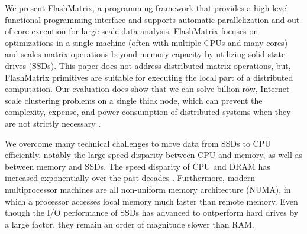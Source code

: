

We present FlashMatrix, a programming framework that provides a high-level
functional programming interface and supports automatic
parallelization and out-of-core execution for large-scale data analysis.
FlashMatrix focuses on optimizations in a single machine (often with multiple
CPUs and many cores) and scales matrix operations beyond memory capacity by 
utilizing solid-state drives (SSDs).  
This paper does not address distributed matrix operations, but, 
FlashMatrix primitives are suitable for executing the local part of a distributed 
computation.   
Our evaluation does show that we can solve billion row, Internet-scale 
clustering problems on a single thick node, which can prevent the complexity,
expense, and power consumption of distributed systems when they are not strictly necessary
\cite{hotos}.








We overcome many technical challenges to move data from SSDs to CPU efficiently,
notably the large speed disparity between CPU and memory, as well as between
memory and SSDs. The speed disparity of CPU and DRAM has increased exponentially
over the past decades \cite{Wilkes01}. Furthermore, modern multiprocessor
machines are all non-uniform memory architecture (NUMA), in which a processor
accesses local memory much faster than remote memory. Even though the I/O
performance of SSDs has advanced to outperform hard drives by a large factor,
they remain an order of magnitude slower than RAM.

